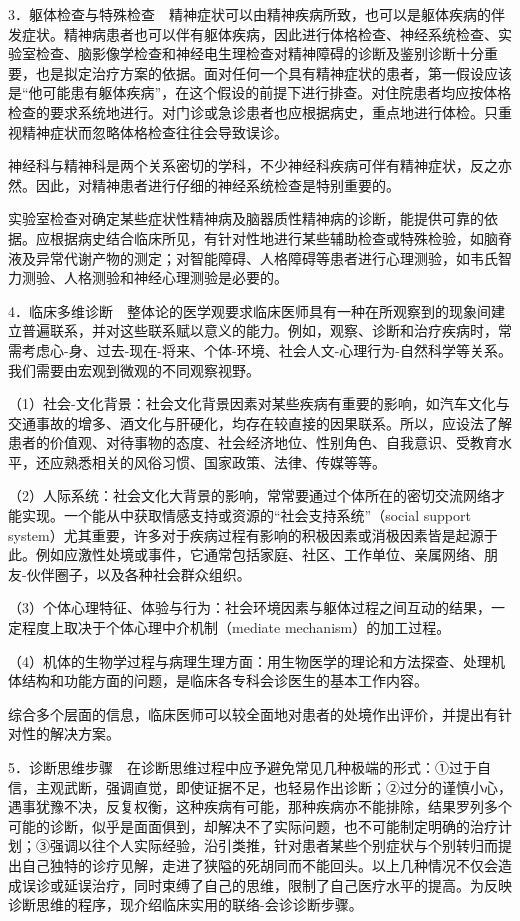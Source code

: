 3．躯体检查与特殊检查　精神症状可以由精神疾病所致，也可以是躯体疾病的伴发症状。精神病患者也可以伴有躯体疾病，因此进行体格检查、神经系统检查、实验室检查、脑影像学检查和神经电生理检查对精神障碍的诊断及鉴别诊断十分重要，也是拟定治疗方案的依据。面对任何一个具有精神症状的患者，第一假设应该是“他可能患有躯体疾病”，在这个假设的前提下进行排查。对住院患者均应按体格检查的要求系统地进行。对门诊或急诊患者也应根据病史，重点地进行体检。只重视精神症状而忽略体格检查往往会导致误诊。

神经科与精神科是两个关系密切的学科，不少神经科疾病可伴有精神症状，反之亦然。因此，对精神患者进行仔细的神经系统检查是特别重要的。

实验室检查对确定某些症状性精神病及脑器质性精神病的诊断，能提供可靠的依据。应根据病史结合临床所见，有针对性地进行某些辅助检查或特殊检验，如脑脊液及异常代谢产物的测定；对智能障碍、人格障碍等患者进行心理测验，如韦氏智力测验、人格测验和神经心理测验是必要的。

4．临床多维诊断　整体论的医学观要求临床医师具有一种在所观察到的现象间建立普遍联系，并对这些联系赋以意义的能力。例如，观察、诊断和治疗疾病时，常需考虑心-身、过去-现在-将来、个体-环境、社会人文-心理行为-自然科学等关系。我们需要由宏观到微观的不同观察视野。

（1）社会-文化背景：社会文化背景因素对某些疾病有重要的影响，如汽车文化与交通事故的增多、酒文化与肝硬化，均存在较直接的因果联系。所以，应设法了解患者的价值观、对待事物的态度、社会经济地位、性别角色、自我意识、受教育水平，还应熟悉相关的风俗习惯、国家政策、法律、传媒等等。

（2）人际系统：社会文化大背景的影响，常常要通过个体所在的密切交流网络才能实现。一个能从中获取情感支持或资源的“社会支持系统”（social
support
system）尤其重要，许多对于疾病过程有影响的积极因素或消极因素皆是起源于此。例如应激性处境或事件，它通常包括家庭、社区、工作单位、亲属网络、朋友-伙伴圈子，以及各种社会群众组织。

（3）个体心理特征、体验与行为：社会环境因素与躯体过程之间互动的结果，一定程度上取决于个体心理中介机制（mediate
mechanism）的加工过程。

（4）机体的生物学过程与病理生理方面：用生物医学的理论和方法探查、处理机体结构和功能方面的问题，是临床各专科会诊医生的基本工作内容。

综合多个层面的信息，临床医师可以较全面地对患者的处境作出评价，并提出有针对性的解决方案。

5．诊断思维步骤　在诊断思维过程中应予避免常见几种极端的形式：①过于自信，主观武断，强调直觉，即使证据不足，也轻易作出诊断；②过分的谨慎小心，遇事犹豫不决，反复权衡，这种疾病有可能，那种疾病亦不能排除，结果罗列多个可能的诊断，似乎是面面俱到，却解决不了实际问题，也不可能制定明确的治疗计划；③强调以往个人实际经验，沿引类推，针对患者某些个别症状与个别转归而提出自己独特的诊疗见解，走进了狭隘的死胡同而不能回头。以上几种情况不仅会造成误诊或延误治疗，同时束缚了自己的思维，限制了自己医疗水平的提高。为反映诊断思维的程序，现介绍临床实用的联络-会诊诊断步骤。

